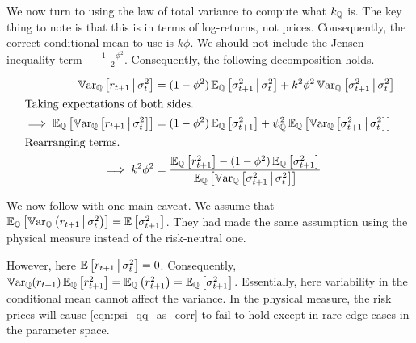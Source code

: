 \documentclass[11pt, letterpaper, twoside, final]{article}
\begin{document}
We now turn to using the law of total variance to compute what $k_{\mathbb{Q}}$ is. 
The key thing to note is that this is in terms of log-returns, not prices.
Consequently, the correct conditional mean to use is $k \phi$. 
We should not include the Jensen-inequality term --- $\frac{1 - \phi^2}{2}$.
Consequently, the following decomposition holds.


\begin{align}
    \Var_{\QQ}\left[r_{t+1} \mvert \sigma^2_t\right]  &= (1 - \phi^2) \E_{\QQ}\left[\sigma^2_{t+1} \mvert
    \sigma^2_t \right] + k^2 \phi^2 \Var_{\QQ}\left[\sigma^2_{t+1} \mvert \sigma^2_t \right]  \\
%
    \intertext{Taking expectations of both sides.}
%
    \implies \E_{\QQ}\left[\Var_{\QQ}\left[r_{t+1} \mvert \sigma^2_t\right]\right]  &= (1 - \phi^2)
    \E_{\QQ}\left[\sigma^2_{t+1} \right] + \psi_{\QQ}^2 \E_{\QQ}\left[\Var_{\QQ}\left[\sigma^2_{t+1} \mvert
    \sigma^2_t \right]\right]  \\
%
    \intertext{Rearranging terms.}
%
    \implies k^2 \phi^2 &= \frac{\E_{\QQ}\left[r^2_{t+1} \right] -  (1 - \phi^2) \E_{\QQ}\left[\sigma^2_{t+1}
    \right]}{\E_{\QQ}\left[\Var_{\QQ}\left[\sigma^2_{t+1} \mvert \sigma^2_t \right]\right]}
    \label{eqn:psi_qq_as_corr}
\end{align}

We now follow \textcite{khrapov2016affine} with one main caveat. 
We assume that $\operatorname{\mathbb{E}}_{\mathbb{Q}}\left[\operatorname{\mathbb{V}ar}_{\mathbb{Q}}\left(r_{t+1} \,\middle\vert\, \sigma^2_t\right)\right] =
\operatorname{\mathbb{E}}\left[\sigma^2_{t+1}\right]$.
They had made the same assumption using the physical measure instead of the risk-neutral one.


However, here $\operatorname{\mathbb{E}}\left[r_{t+1} \,\middle\vert\, \sigma^2_{t}\right] = 0$.
Consequently, $\operatorname{\mathbb{V}ar}_{\mathbb{Q}}(r_{t+1}) \operatorname{\mathbb{E}}_{\mathbb{Q}}\left[r_{t+1}^2\right]  = \operatorname{\mathbb{E}}_{\mathbb{Q}}\left(r^2_{t+1}\right) =
\operatorname{\mathbb{E}}_{\mathbb{Q}}\left[\sigma^2_{t+1}\right]$.
Essentially, here variability in the conditional mean cannot affect the variance.
In the physical measure, the risk prices will cause  \cref{eqn:psi_qq_as_corr} to fail to hold except in rare edge
cases in the parameter space.
\end{document}
